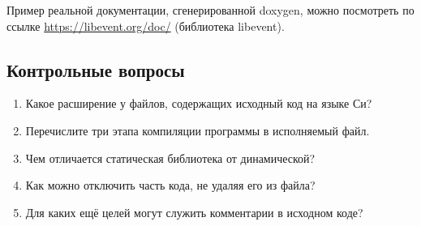 \documentclass[myc.tex]{subfiles}
\begin{document}
Пример реальной документации, сгенерированной doxygen, можно посмотреть по ссылке \url{https://libevent.org/doc/} (библиотека libevent).


































\vfill
\subsection*{Контрольные вопросы}
\begin{enumerate}
\item Какое расширение у файлов, содержащих исходный код на языке Си?
\item Перечислите три этапа компиляции программы в исполняемый файл.
\item Чем отличается статическая библиотека от динамической?
\item Как можно отключить часть кода, не удаляя его из файла?
\item Для каких ещё целей могут служить комментарии в исходном коде?
\end{enumerate}
\end{document}

